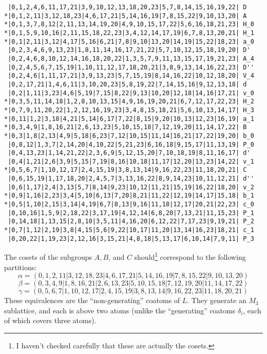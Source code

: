 \begin{verbatim}
 |0,1,2,4,6,11,17,21|3,9,10,12,13,18,20,23|5,7,8,14,15,16,19,22| D
*|0,1,2,11|3,12,18,23|4,6,17,21|5,14,16,19|7,8,15,22|9,10,13,20| A
*|0,1,3,7,8,12|2,11,13,14,19,20|4,9,10,15,17,22|5,6,16,18,21,23| H_0
*|0,1,5,9,10,16|2,11,15,18,22,23|3,4,12,14,17,19|6,7,8,13,20,21| H_1
*|0,1|2,11|3,12|4,17|5,16|6,21|7,8|9,10|13,20|14,19|15,22|18,23| a_0
 |0,2,3,4,6,9,13,23|1,8,11,14,16,17,21,22|5,7,10,12,15,18,19,20| D'
 |0,2,4,6,8,10,12,14,16,18,20,22|1,3,5,7,9,11,13,15,17,19,21,23| A_4
 |0,2,4,5,6,7,15,19|1,10,11,12,17,18,20,21|3,8,9,13,14,16,22,23| D''
 |0,2,4,6|1,11,17,21|3,9,13,23|5,7,15,19|8,14,16,22|10,12,18,20| V_4
 |0,2,17,21|1,4,6,11|3,10,20,23|5,8,19,22|7,14,15,16|9,12,13,18| d
 |0,2|1,11|3,23|4,6|5,19|7,15|8,22|9,13|10,20|12,18|14,16|17,21| v_0
*|0,3,5,11,14,18|1,2,8,10,13,15|4,9,16,19,20,21|6,7,12,17,22,23| H_2
*|0,7,9,11,20,22|1,2,12,16,19,23|3,4,8,15,18,21|5,6,10,13,14,17| H_3
*|0,11|1,2|3,18|4,21|5,14|6,17|7,22|8,15|9,20|10,13|12,23|16,19| a_1
*|0,3,4,9|1,8,16,21|2,6,13,23|5,10,15,18|7,12,19,20|11,14,17,22| B
*|0,3|1,8|2,13|4,9|5,18|6,23|7,12|10,15|11,14|16,21|17,22|19,20| b_0
 |0,8,12|1,3,7|2,14,20|4,10,22|5,21,23|6,16,18|9,15,17|11,13,19| P_0
 |0,4,13,23|1,14,21,22|2,3,6,9|5,12,15,20|7,10,18,19|8,11,16,17| d'
 |0,4|1,21|2,6|3,9|5,15|7,19|8,16|10,18|11,17|12,20|13,23|14,22| v_1
*|0,5,6,7|1,10,12,17|2,4,15,19|3,8,13,14|9,16,22,23|11,18,20,21| C
 |0,6,15,19|1,17,18,20|2,4,5,7|3,13,16,22|8,9,14,23|10,11,12,21| d''
 |0,6|1,17|2,4|3,13|5,7|8,14|9,23|10,12|11,21|15,19|16,22|18,20| v_2
*|0,9|1,16|2,23|3,4|5,10|6,13|7,20|8,21|11,22|12,19|14,17|15,18| b_1
*|0,5|1,10|2,15|3,14|4,19|6,7|8,13|9,16|11,18|12,17|20,21|22,23| c_0
 |0,10,16|1,5,9|2,18,22|3,17,19|4,12,14|6,8,20|7,13,21|11,15,23| P_1
 |0,14,18|1,13,15|2,8,10|3,5,11|4,16,20|6,12,22|7,17,23|9,19,21| P_2
*|0,7|1,12|2,19|3,8|4,15|5,6|9,22|10,17|11,20|13,14|16,23|18,21| c_1
 |0,20,22|1,19,23|2,12,16|3,15,21|4,8,18|5,13,17|6,10,14|7,9,11| P_3
\end{verbatim}
\newpage
The cosets of the subgroups $A, B$, and $C$ should\footnote{I haven't checked carefully that these are actually the cosets.}
correspond to the following partitions:
\[
\alpha = (0,1,2,11|3,12,18,23|4,6,17,21|5,14,16,19|7,8,15,22|9,10,13,20)
\]
\[
\beta = (0,3,4,9|1,8,16,21|2,6,13,23|5,10,15,18|7,12,19,20|11,14,17,22)
\]
\[
\gamma = (0,5,6,7|1,10,12,17|2,4,15,19|3,8,13,14|9,16,22,23|11,18,20,21)
\]
These equivalences are the ``non-generating'' coatoms of $L$.  
They generate an $M_3$ sublattice, and each is above two atoms 
(unlike the ``generating'' coatoms $\delta_i$, each of which covers three atoms).  

